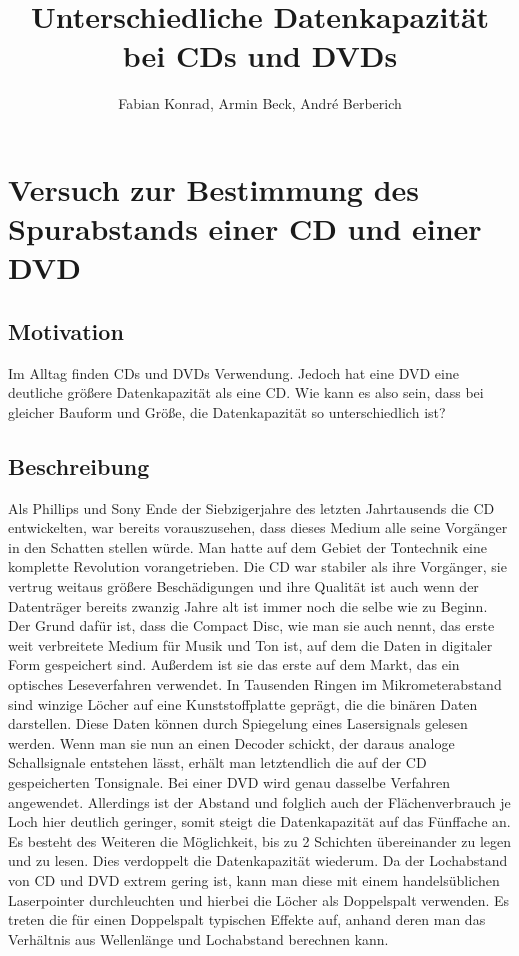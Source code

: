 \documentclass{scrreprt}
\author{Fabian Konrad, Armin Beck, André Berberich}
\title{Unterschiedliche Datenkapazität bei CDs und DVDs}
\begin{document}
\maketitle
\newpage

\chapter{Versuch zur Bestimmung des Spurabstands einer CD und einer DVD}

\section{Motivation}
Im Alltag finden CDs und DVDs Verwendung. Jedoch hat eine DVD eine deutliche größere Datenkapazität als eine CD. Wie kann es also sein, dass bei gleicher Bauform und Größe, die Datenkapazität so unterschiedlich ist?

\section{Beschreibung}
Als Phillips und Sony Ende der Siebzigerjahre des letzten Jahrtausends die CD entwickelten, war bereits vorauszusehen, dass dieses Medium alle seine Vorgänger in den Schatten stellen würde. Man hatte auf dem Gebiet der Tontechnik eine komplette Revolution vorangetrieben. Die CD war stabiler als ihre Vorgänger, sie vertrug weitaus größere Beschädigungen und ihre Qualität ist auch wenn der Datenträger bereits zwanzig Jahre alt ist immer noch die selbe wie zu Beginn. Der Grund dafür ist, dass die Compact Disc, wie man sie auch nennt, das erste weit verbreitete Medium für Musik und Ton ist, auf dem die Daten in digitaler Form gespeichert sind. Außerdem ist sie das erste auf dem Markt, das ein optisches Leseverfahren verwendet. In Tausenden Ringen im Mikrometerabstand sind winzige Löcher auf eine Kunststoffplatte geprägt, die die binären Daten darstellen. Diese Daten können durch Spiegelung eines Lasersignals gelesen werden. Wenn man sie nun an einen Decoder schickt, der daraus analoge Schallsignale entstehen lässt, erhält man letztendlich die auf der CD gespeicherten Tonsignale. Bei einer DVD wird genau dasselbe Verfahren angewendet. Allerdings ist der Abstand und folglich auch der Flächenverbrauch je Loch hier deutlich geringer, somit steigt die Datenkapazität auf das Fünffache an. Es besteht des Weiteren die Möglichkeit, bis zu 2 Schichten übereinander zu legen und zu lesen. Dies verdoppelt die Datenkapazität wiederum. Da der Lochabstand von CD und DVD extrem gering ist, kann man diese mit einem handelsüblichen Laserpointer durchleuchten und hierbei die Löcher als Doppelspalt verwenden. Es treten die für einen Doppelspalt typischen Effekte auf, anhand deren man das Verhältnis aus Wellenlänge und Lochabstand berechnen kann.
\end{document}
